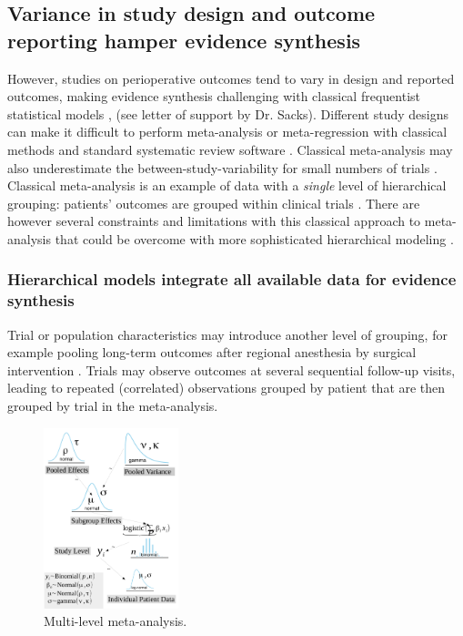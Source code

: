 \documentclass[11pt,notitlepage]{article}
\begin{document}
\subsection*{Variance in study design and outcome reporting hamper evidence synthesis}
However, studies on perioperative outcomes tend to vary in design and reported outcomes\cite{Andreae2013}, making 
evidence synthesis challenging with classical frequentist statistical models \cite{Spiegelhalter_11134920}, (see 
letter of support by Dr. Sacks). Different study designs can make it difficult to perform meta-analysis or meta-regression 
with classical methods and standard systematic review software \cite{Deeks2011chapter}. Classical meta-analysis may also 
underestimate the between-study-variability for small numbers of trials \cite{Song2012,Cornell2014,Andreae2015}. 
Classical meta-analysis is an example of data with a \textit{single} level of hierarchical grouping: patients' 
outcomes are grouped within clinical trials \cite{egger2008systematic}. There are however several constraints and limitations 
with this classical approach to meta-analysis that could be overcome with more sophisticated hierarchical modeling  
\cite{Andreae2015,Thompson2002,Abroug2011}.

\subsubsection*{Hierarchical models integrate all available data for evidence synthesis}

Trial or population characteristics may introduce another level of grouping, for example pooling long-term outcomes 
after regional anesthesia by surgical intervention \cite{Andreae2013,Abroug2011}. Trials may observe outcomes at several 
sequential follow-up visits, leading to repeated (correlated) observations grouped by patient that are then grouped by trial 
in the meta-analysis.

\begin{figure} 
 \vspace*{-14pt}
  \includegraphics[width=0.35\textwidth]{Figures/DistrogramMultiLevelMetaAnalysis.pdf} 
 \caption{Multi-level meta-analysis.}
 \vspace{-10pt}
 \label{fig:MetaAnalysis}
 \vspace*{-10pt}
\end{figure}
\end{document}
